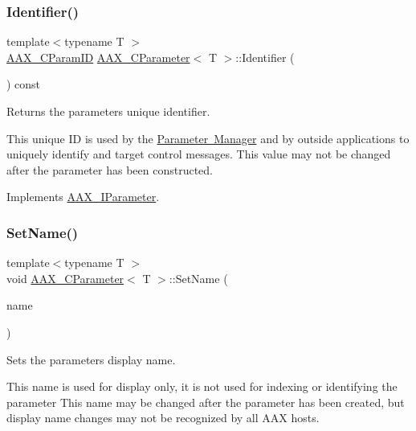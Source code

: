 \subsubsection{\texorpdfstring{Identifier()}{Identifier()}}
{\footnotesize\ttfamily template$<$typename T $>$ \\
\mbox{\hyperlink{a00392_a1440c756fe5cb158b78193b2fc1780d1}{A\+A\+X\+\_\+\+C\+Param\+ID}} \mbox{\hyperlink{a01537}{A\+A\+X\+\_\+\+C\+Parameter}}$<$ T $>$\+::Identifier (\begin{DoxyParamCaption}{ }\end{DoxyParamCaption}) const\hspace{0.3cm}{\ttfamily [virtual]}}



Returns the parameter\textquotesingle{}s unique identifier. 

This unique ID is used by the \mbox{\hyperlink{a00814}{Parameter Manager}} and by outside applications to uniquely identify and target control messages. This value may not be changed after the parameter has been constructed. 

Implements \mbox{\hyperlink{a01857_a28807db424a720daa9880ed9ee5d4d21}{A\+A\+X\+\_\+\+I\+Parameter}}.

\mbox{\label{a01537_a95ccc6ef9aff70e029c55caf2c2bd432}} 
\subsubsection{\texorpdfstring{SetName()}{SetName()}}
{\footnotesize\ttfamily template$<$typename T $>$ \\
void \mbox{\hyperlink{a01537}{A\+A\+X\+\_\+\+C\+Parameter}}$<$ T $>$\+::Set\+Name (\begin{DoxyParamCaption}\item[{const \mbox{\hyperlink{a01573}{A\+A\+X\+\_\+\+C\+String}} \&}]{name }\end{DoxyParamCaption})\hspace{0.3cm}{\ttfamily [virtual]}}



Sets the parameter\textquotesingle{}s display name. 

This name is used for display only, it is not used for indexing or identifying the parameter This name may be changed after the parameter has been created, but display name changes may not be recognized by all A\+AX hosts.


